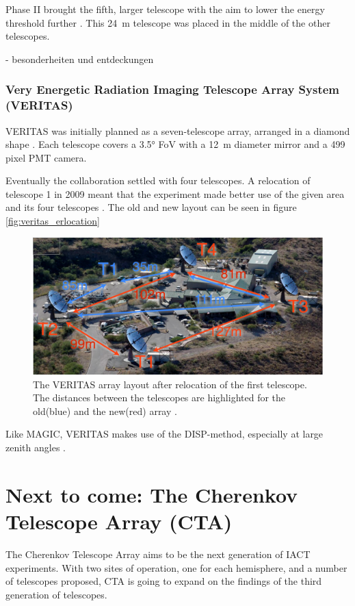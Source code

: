 Phase II brought the fifth, larger telescope with the aim to lower the energy threshold
further \cite{vincent2005hess}. This \SI{24}{\meter} telescope was placed in the middle of the other
telescopes.

- besonderheiten und entdeckungen

\subsubsection{Very Energetic Radiation Imaging Telescope Array System (VERITAS)}
VERITAS	was initially planned as a seven-telescope array, arranged in a diamond shape
\cite{WEEKES2020221}.
Each telescope covers a 3.5° FoV with a \SI{12}{\meter} diameter mirror and 
a 499 pixel PMT camera.


Eventually the collaboration settled 
with four telescopes. A relocation of telescope 1 in 2009 meant that the 
experiment made better use of the given area and its four telescopes \cite{2009arXiv0912.3841P}.
The old and new layout can be seen in figure \ref{fig:veritas_erlocation}

\begin{figure}
	\center
	\includegraphics[width=.8\textwidth]{images/veritas_relocation.png}
	\caption{The VERITAS array layout after relocation of the first 
		telescope. The distances between the telescopes are 
	highlighted for the old(blue) and the new(red) array \cite{2009arXiv0912.3841P}.}
	\label{fig:veritas_relocation}
\end{figure}

Like MAGIC, VERITAS makes use of the DISP-method, especially at large zenith angles 
\cite{2015ICRC...34..771P}.



\section{Next to come: The Cherenkov Telescope Array (CTA)}
The Cherenkov Telescope Array aims to be the next generation of IACT experiments.
With two sites of operation, one for each hemisphere, and a number of 
telescopes proposed, CTA is going to expand on the findings of the third 
generation of telescopes.

